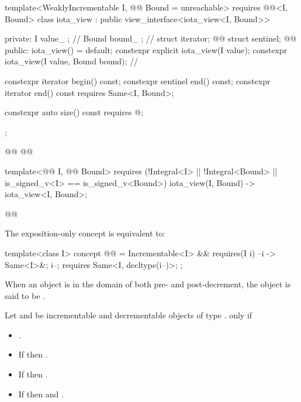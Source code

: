 {\begin{codeblock}
{  template<WeaklyIncrementable I, @@ Bound = unreachable>
    requires @@<I, Bound>
  class iota_view : public view_interface<iota_view<I, Bound>> {
  private:
    I value_ {};     // \expos
    Bound bound_ {}; // \expos
    struct iterator; @\newtxt{// \expos}@
    struct sentinel; @\newtxt{// \expos}@
  public:
    iota_view() = default;
    constexpr explicit iota_view(I value);
    constexpr iota_view(I value, Bound bound); // \seebelow

    constexpr iterator begin() const;
    constexpr sentinel end() const;
    constexpr iterator end() const requires Same<I, Bound>;

    constexpr auto size() const requires @\seebelownc@;
  };

  @@
  @@

  template<@@ I, @@ Bound>
    requires
      (!Integral<I> || !Integral<Bound> || is_signed_v<I> == is_signed_v<Bound>)
  iota_view(I, Bound) -> iota_view<I, Bound>;
}@\oldtxt{\}}@
\end{codeblock}

\pnum
The exposition-only  concept is equivalent to:
\begin{itemdecl}
template<class I>
concept @@ =
  Incrementable<I> && requires(I i) {
    { --i } -> Same<I>&;
    i--; requires Same<I, decltype(i--)>;
  };
\end{itemdecl}

\begin{itemdescr}
\pnum
When an object is in the domain of both pre- and post-decrement,
the object is said to be .

\pnum
Let  and  be incrementable and decrementable objects of type
. 
  only if
\begin{itemize}
\item {}.
\item If  then .
\item If  then .
\item If  then  and
.
\end{itemize}
\end{itemdescr}

}
